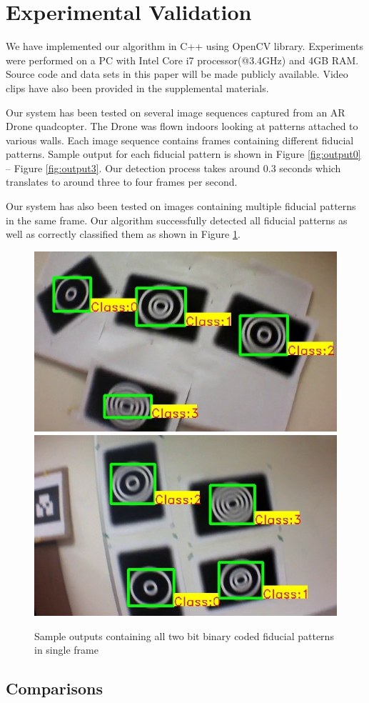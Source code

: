 \documentclass[runningheads]{llncs}
\begin{document}
\section{Experimental Validation}

We have implemented our algorithm in C++ using OpenCV library.
Experiments were performed on a PC with Intel Core i7 processor(@3.4GHz) and 4GB RAM.
Source code and data sets in this paper will be made publicly available.  Video clips
have also been provided in the supplemental materials.

Our system has been tested on several image sequences captured from an AR Drone
quadcopter.  The Drone was flown indoors looking at patterns attached to various walls.
Each image sequence contains frames containing different fiducial
patterns. Sample output for each fiducial pattern is shown in Figure
\ref{fig:output0} -- Figure \ref{fig:output3}. Our detection process takes
around 0.3 seconds which translates to around three to four frames per second.



Our system has also been tested on images containing multiple fiducial patterns
in the same frame. Our algorithm successfully detected all fiducial patterns as
well as correctly classified them as shown in Figure \ref{fig:output_all}.

\begin{figure}
\centering
  \includegraphics[width=.45\linewidth]{output_all_2.jpg}
  \includegraphics[width=.45\linewidth]{new_results/output_test_all1.jpg}
  \caption{Sample outputs containing all two bit binary coded fiducial patterns
  in single frame}
  \label{fig:output_all}
\end{figure}

\subsection{Comparisons}
\end{document}
